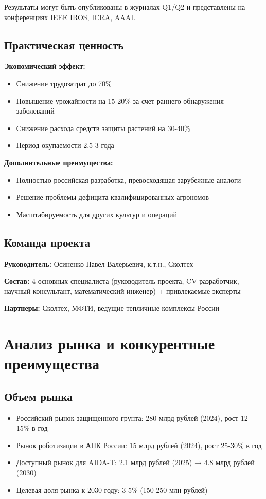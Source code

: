 \documentclass[12pt,a4paper]{article}
\begin{document}
Результаты могут быть опубликованы в журналах Q1/Q2 и представлены на конференциях IEEE IROS, ICRA, AAAI.

\subsection{Практическая ценность}

\textbf{Экономический эффект:}
\begin{itemize}
    \item Снижение трудозатрат до 70\%
    \item Повышение урожайности на 15-20\% за счет раннего обнаружения заболеваний
    \item Снижение расхода средств защиты растений на 30-40\%
    \item Период окупаемости 2.5-3 года
\end{itemize}

\textbf{Дополнительные преимущества:}
\begin{itemize}
    \item Полностью российская разработка, превосходящая зарубежные аналоги
    \item Решение проблемы дефицита квалифицированных агрономов
    \item Масштабируемость для других культур и операций
\end{itemize}

\subsection{Команда проекта}
\textbf{Руководитель:} Осиненко Павел Валерьевич, к.т.н., Сколтех

\textbf{Состав:} 4 основных специалиста (руководитель проекта, CV-разработчик, научный консультант, математический инженер) + привлекаемые эксперты

\textbf{Партнеры:} Сколтех, МФТИ, ведущие тепличные комплексы России

\section{Анализ рынка и конкурентные преимущества}

\subsection{Объем рынка}
\begin{itemize}
    \item Российский рынок защищенного грунта: 280 млрд рублей (2024), рост 12-15\% в год
    \item Рынок роботизации в АПК России: 15 млрд рублей (2024), рост 25-30\% в год
    \item Доступный рынок для AIDA-T: 2.1 млрд рублей (2025) → 4.8 млрд рублей (2030)
    \item Целевая доля рынка к 2030 году: 3-5\% (150-250 млн рублей)
\end{itemize}
\end{document}
